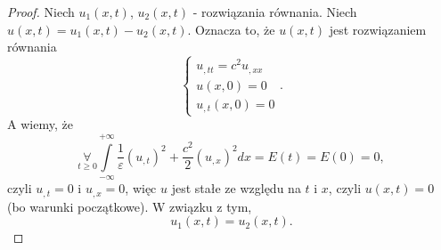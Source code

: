 \documentclass[../main.tex]{subfiles}
\begin{document}
\begin{proof}
		Niech $u_1(x,t)$, $u_2(x,t)$ - rozwiązania równania. Niech $u(x,t) = u_1(x,t) - u_2(x,t)$. Oznacza to, że $u(x,t)$ jest rozwiązaniem równania
		\[
		\begin{cases}
				u_{,t t} = c^2 u_{,x x}\\
				u(x,0)=0\\
				u_{,t}(x,0) = 0
		\end{cases}
		.\]
		A wiemy, że
		\[
				\underset{t\ge 0}{\forall} \int\limits_{-\infty}^{+\infty}\frac{1}{\varepsilon}(u_{,t})^2 + \frac{c^2}{2}(u_{,x})^2dx = E(t) = E(0) = 0
		,\]
		czyli $u_{,t} = 0$ i $u_{,x} = 0$, więc $u$ jest stałe ze względu na $t$ i $x$, czyli $u(x,t) = 0$ (bo warunki początkowe). W związku z tym,
		\[
				u_1(x,t) = u_2(x,t)
		.\]
\end{proof}
\end{document}
